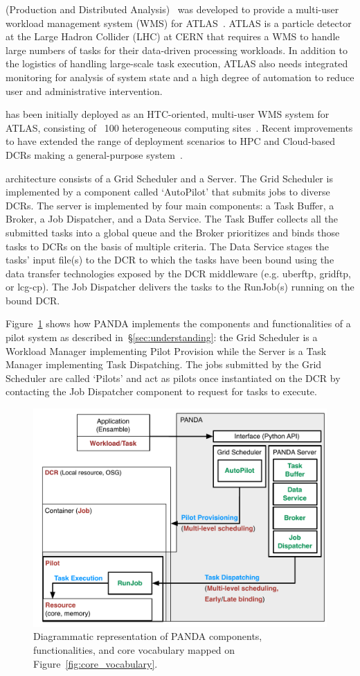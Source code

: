\documentclass{sig-alternate}
\begin{document}

\panda (Production and Distributed Analysis)~\cite{1742-6596-331-7-072069} was
developed to provide a multi-user workload management system (WMS) for
ATLAS~\cite{aad2008atlas}. ATLAS is a particle detector at the Large Hadron
Collider (LHC) at CERN that requires a WMS to handle large numbers of tasks for
their data-driven processing workloads. In addition to the logistics of handling
large-scale task execution, ATLAS also needs integrated monitoring for analysis
of system state and a high degree of automation to reduce user and
administrative intervention.

\panda has been initially deployed as an HTC-oriented, multi-user WMS system for
ATLAS, consisting of ~100 heterogeneous computing sites~\cite{maeno_pd2p:_2012}.
Recent improvements to \panda have extended the range of deployment scenarios to
HPC and Cloud-based DCRs making \panda a general-purpose \pilot
system~\cite{nilsson2012recent}.

\panda architecture consists of a Grid Scheduler and a \panda Server. The Grid
Scheduler is implemented by a component called `AutoPilot' that submits jobs to
diverse DCRs. The \panda server is implemented by four main components: a Task
Buffer, a Broker, a Job Dispatcher, and a Data Service. The Task Buffer collects
all the submitted tasks into a global queue and the Broker prioritizes and binds
those tasks to DCRs on the basis of multiple criteria. The Data Service stages
the tasks' input file(s) to the DCR to which the tasks have been bound using the
data transfer technologies exposed by the DCR middleware (e.g. uberftp, gridftp,
or lcg-cp). The Job Dispatcher delivers the tasks to the RunJob(s) running on
the bound DCR.

Figure~\ref{fig:panda_comparison} shows how PANDA implements the components and
functionalities of a pilot system as described in~\S\ref{sec:understanding}: the
Grid Scheduler is a Workload Manager implementing Pilot Provision while the
\panda Server is a Task Manager implementing Task Dispatching. The jobs
submitted by the Grid Scheduler are called `Pilots' and act as pilots once
instantiated on the DCR by contacting the Job Dispatcher component to request
for tasks to execute.

\begin{figure}[t]
    \centering
        \includegraphics[width=.48\textwidth]{figures/panda_comparison.pdf}
    \caption{Diagrammatic representation of PANDA components, functionalities,
    and core vocabulary mapped on Figure~\ref{fig:core_vocabulary}.}
    \label{fig:panda_comparison}
\end{figure}
\end{document}
